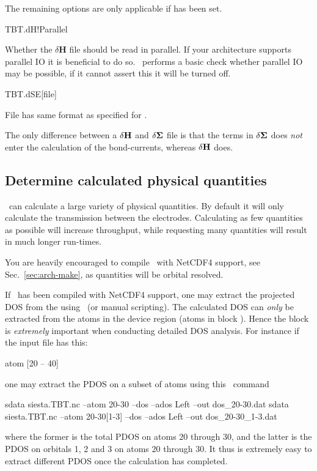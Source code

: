 The remaining options are only applicable if  has been
set. 

\begin{fdflogicalT}{TBT.dH!Parallel}

  Whether the $\delta\mathbf H$ file should be read in parallel. If
  your architecture supports parallel IO it is beneficial to do so. 
  \tbtrans\ performs a basic check whether parallel IO may be
  possible, if it cannot assert this it will be turned off.
  
\end{fdflogicalT}

\begin{fdfentry}{TBT.dSE}[file]

  File has same format as specified for .

  The only difference between a $\delta\mathbf H$ and $\delta\mathbf\Sigma$ file is that the
  terms in $\delta\mathbf\Sigma$ does \emph{not} enter the calculation of the
  bond-currents, whereas $\delta\mathbf H$ does.

\end{fdfentry}

\subsection{Determine calculated physical quantities}
\label{sec:physical}

\tbtrans\ can calculate a large variety of physical
quantities. By default it will only calculate the transmission between
the electrodes. Calculating as few quantities as possible will
increase throughput, while requesting many quantities will result in
much longer run-times.

You are heavily encouraged to compile \tbtrans\ with NetCDF4 support,
see Sec.~\ref{sec:arch-make}, as quantities will be orbital resolved. 

If \tbtrans\ has been compiled with NetCDF4 support, one may extract
the projected DOS from the  using \sisl\ (or manual
scripting). The calculated DOS can \emph{only} be extracted from the
atoms in the device region (atoms in block
). Hence the  block is
\emph{extremely} important when conducting detailed DOS analysis. 
For instance if the input file has this:
\begin{fdfexample}
    atom [20 -- 40]
\end{fdfexample}
one may extract the PDOS on a subset of atoms using this \sisl\
command
\begin{shellexample}
  sdata siesta.TBT.nc --atom 20-30 --dos --ados Left --out dos_20-30.dat
  sdata siesta.TBT.nc --atom 20-30[1-3] --dos --ados Left --out dos_20-30_1-3.dat
\end{shellexample}
where the former is the total PDOS on atoms $20$ through $30$, and the
latter is the PDOS on orbitals 1, 2 and 3 on atoms $20$ through
$30$. It thus is extremely easy to extract different PDOS once the
calculation has completed. 

